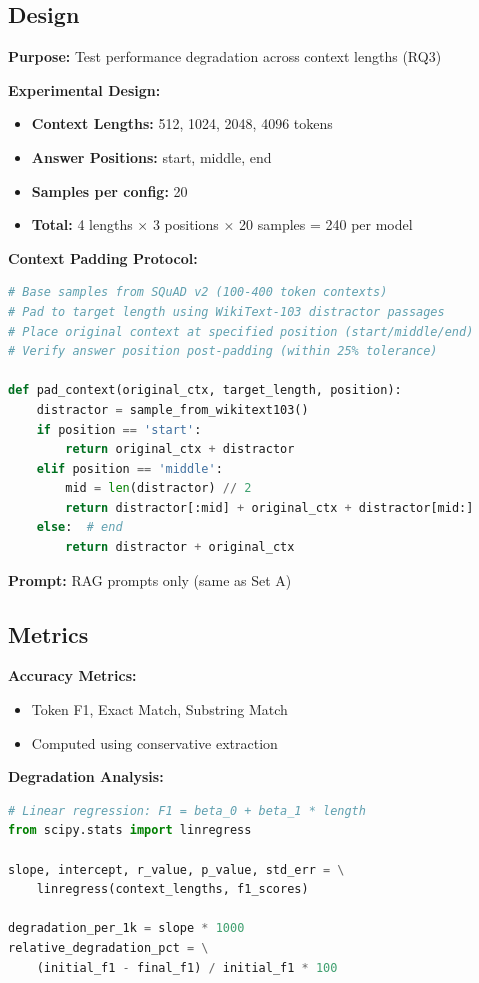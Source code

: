 \documentclass[11pt,a4paper]{article}
\begin{document}
\subsection{Design}

\textbf{Purpose:} Test performance degradation across context lengths (RQ3)

\textbf{Experimental Design:}
\begin{itemize}
\item \textbf{Context Lengths:} 512, 1024, 2048, 4096 tokens
\item \textbf{Answer Positions:} start, middle, end
\item \textbf{Samples per config:} 20
\item \textbf{Total:} 4 lengths $\times$ 3 positions $\times$ 20 samples = 240 per model
\end{itemize}

\textbf{Context Padding Protocol:}
\begin{lstlisting}[language=Python]
# Base samples from SQuAD v2 (100-400 token contexts)
# Pad to target length using WikiText-103 distractor passages
# Place original context at specified position (start/middle/end)
# Verify answer position post-padding (within 25% tolerance)

def pad_context(original_ctx, target_length, position):
    distractor = sample_from_wikitext103()
    if position == 'start':
        return original_ctx + distractor
    elif position == 'middle':
        mid = len(distractor) // 2
        return distractor[:mid] + original_ctx + distractor[mid:]
    else:  # end
        return distractor + original_ctx
\end{lstlisting}

\textbf{Prompt:} RAG prompts only (same as Set A)

\subsection{Metrics}

\textbf{Accuracy Metrics:}
\begin{itemize}
\item Token F1, Exact Match, Substring Match
\item Computed using conservative extraction
\end{itemize}

\textbf{Degradation Analysis:}
\begin{lstlisting}[language=Python]
# Linear regression: F1 = beta_0 + beta_1 * length
from scipy.stats import linregress

slope, intercept, r_value, p_value, std_err = \
    linregress(context_lengths, f1_scores)

degradation_per_1k = slope * 1000
relative_degradation_pct = \
    (initial_f1 - final_f1) / initial_f1 * 100
\end{lstlisting}
\end{document}
